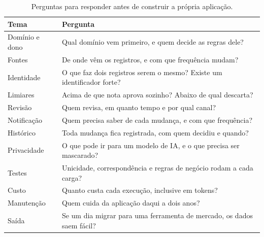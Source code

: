 
\begin{table}[htbp]
  \centering
  \caption{Perguntas para responder antes de construir a própria aplicação.}
  \label{tab:checklist-aplicacao}
  \small
  \begin{tabularx}{\textwidth}{@{}>{\raggedright\arraybackslash}p{}
      >{\raggedright\arraybackslash}X@{}}
    \toprule
    Tema & Pergunta \\
    \midrule
    Domínio e dono & Qual domínio vem primeiro, e quem decide as regras dele? \\
    Fontes & De onde vêm os registros, e com que frequência mudam? \\
    Identidade & O que faz dois registros serem o mesmo? Existe um identificador forte? \\
    Limiares & Acima de que nota aprova sozinho? Abaixo de qual descarta? \\
    Revisão & Quem revisa, em quanto tempo e por qual canal? \\
    Notificação & Quem precisa saber de cada mudança, e com que frequência? \\
    Histórico & Toda mudança fica registrada, com quem decidiu e quando? \\
    Privacidade & O que pode ir para um modelo de IA, e o que precisa ser mascarado? \\
    Testes & Unicidade, correspondência e regras de negócio rodam a cada carga? \\
    Custo & Quanto custa cada execução, inclusive em tokens? \\
    Manutenção & Quem cuida da aplicação daqui a dois anos? \\
    Saída & Se um dia migrar para uma ferramenta de mercado, os dados saem fácil? \\
    \bottomrule
  \end{tabularx}
\end{table}

\begin{leituras}
\end{leituras}
